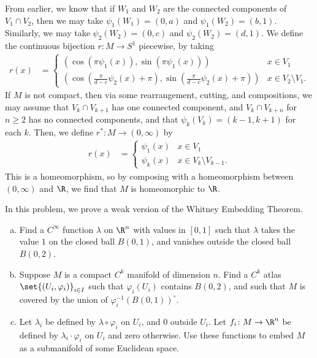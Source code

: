 \documentclass[10pt]{mypackage}
\begin{document}
\begin{solution}
  From earlier, we know that if $W_1$ and $W_2$ are the connected components of $V_1\cap V_2$, then we may take $\psi_1\left( W_1 \right) = (0,a)$ and $\psi_1\left( W_2 \right) = (b,1)$. Similarly, we may take $\psi_2\left( W_2 \right) = (0,c)$ and $\psi_2\left( W_2 \right) = (d,1)$. We define the continuous bijection $r\colon M\rightarrow S^{1}$ piecewise, by taking
  \begin{align*}
    r(x) &= \begin{cases}
      \left( \cos\left( \pi \psi_1(x) \right),\sin\left( \pi\psi_1(x) \right) \right) & x\in V_1\\
      \left( \cos\left( \frac{\pi}{d-c} \psi_2(x) + \pi \right),\sin\left( \frac{\pi}{d-c}\psi_2(x) + \pi \right) \right) & x\in V_2\setminus V_1.
    \end{cases}
  \end{align*}
  If $M$ is not compact, then via some rearrangement, cutting, and compositions, we may assume that $V_k\cap V_{k+1}$ has one connected component, and $V_k\cap V_{k+n}$ for $n\geq 2$ has no connected components, and that $\psi_k\left( V_k \right) = (k-1,k+1)$ for each $k$. Then, we define $r^{\ast}\colon M\rightarrow (0,\infty)$ by
  \begin{align*}
    r(x) &= \begin{cases}
      \psi_1(x) & x\in V_1\\
      \psi_k(x) & x\in V_{k}\setminus V_{k-1}.
    \end{cases}
  \end{align*}
  This is a homeomorphism, so by composing with a homeomorphism between $\left( 0,\infty \right)$ and $\R$, we find that $M$ is homeomorphic to $\R$.
\end{solution}
\begin{problem}[Problem 5]
  In this problem, we prove a weak version of the Whitney Embedding Theorem.
  \begin{enumerate}[(a)]
    \item Find a $C^{\infty}$ function $\lambda$ on $\R^{n}$ with values in $[0,1]$ such that $\lambda$ takes the value $1$ on the closed ball $B\left( 0,1 \right)$, and vanishes outside the closed ball $B\left( 0,2 \right)$.
    \item Suppose $M$ is a compact $C^{k}$ manifold of dimension $n$. Find a $C^{k}$ atlas $\set{\left( U_i,\varphi_i \right)}_{i\in I}$ such that $\varphi_i\left( U_i \right)$ contains $B\left( 0,2 \right)$, and such that $M$ is covered by the union of $\varphi_i^{-1}\left( B\left( 0,1 \right) \right)^{\circ}$.
    \item Let $\lambda_i$ be defined by $\lambda\circ\varphi_i$ on $U_i$, and $0$ outside $U_i$. Let $f_i\colon M\rightarrow \R^n$ be defined by $\lambda_i\cdot\varphi_i$ on $U_i$ and zero otherwise. Use these functions to embed $M$ as a submanifold of some Euclidean space.
  \end{enumerate}
\end{problem}
\end{document}
